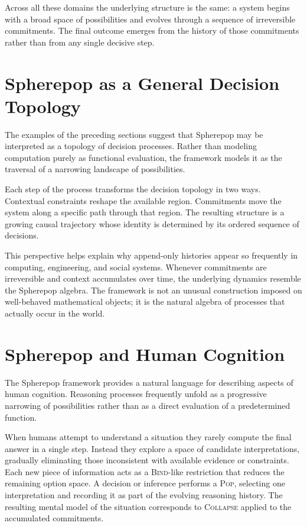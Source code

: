\documentclass[12pt]{article}
\begin{document}
Across all these domains the underlying structure is the same: a system begins with a broad space of possibilities and evolves through a sequence of irreversible commitments. The final outcome emerges from the history of those commitments rather than from any single decisive step.

\section{Spherepop as a General Decision Topology}
\label{sec:topology}

The examples of the preceding sections suggest that Spherepop may be interpreted as a topology of decision processes. Rather than modeling computation purely as functional evaluation, the framework models it as the traversal of a narrowing landscape of possibilities.

Each step of the process transforms the decision topology in two ways. Contextual constraints reshape the available region. Commitments move the system along a specific path through that region. The resulting structure is a growing causal trajectory whose identity is determined by its ordered sequence of decisions.

This perspective helps explain why append-only histories appear so frequently in computing, engineering, and social systems. Whenever commitments are irreversible and context accumulates over time, the underlying dynamics resemble the Spherepop algebra. The framework is not an unusual construction imposed on well-behaved mathematical objects; it is the natural algebra of processes that actually occur in the world.

\section{Spherepop and Human Cognition}
\label{sec:cognition}

The Spherepop framework provides a natural language for describing aspects of human cognition. Reasoning processes frequently unfold as a progressive narrowing of possibilities rather than as a direct evaluation of a predetermined function.

When humans attempt to understand a situation they rarely compute the final answer in a single step. Instead they explore a space of candidate interpretations, gradually eliminating those inconsistent with available evidence or constraints. Each new piece of information acts as a \textsc{Bind}-like restriction that reduces the remaining option space. A decision or inference performs a \textsc{Pop}, selecting one interpretation and recording it as part of the evolving reasoning history. The resulting mental model of the situation corresponds to \textsc{Collapse} applied to the accumulated commitments.
\end{document}
